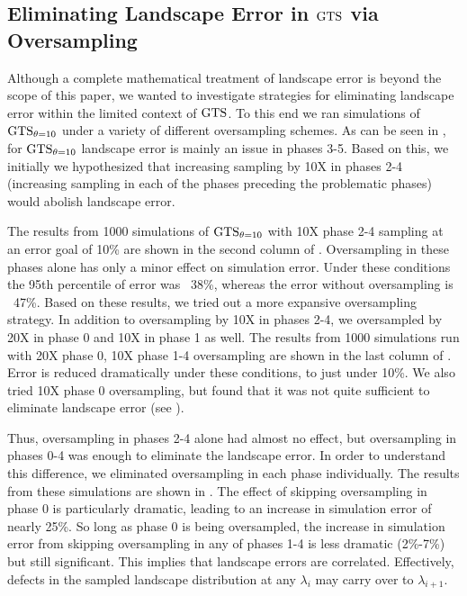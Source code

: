 \subsection{Eliminating Landscape Error in $\text{GTS}$ via Oversampling}
\label{sec:oversampling}

Although a complete mathematical treatment of landscape error is beyond the scope of this paper, we wanted to investigate strategies for eliminating landscape error within the limited context of $\text{GTS}$. To this end we ran  simulations of $\text{GTS}_{\theta=10}$ under a variety of different oversampling schemes. As can be seen in , for $\text{GTS}_{\theta=10}$ landscape error is mainly an issue in phases 3-5. Based on this, we initially we hypothesized that increasing sampling by 10X in phases 2-4 (\ie increasing sampling in each of the phases preceding the problematic phases) would abolish landscape error.

The results from 1000 simulations of $\text{GTS}_{\theta=10}$ with 10X phase 2-4 sampling at an error goal of 10\% are shown in the second column of . Oversampling in these phases alone has only a minor effect on simulation error. Under these conditions the 95th percentile of error was ~38\%, whereas the error without oversampling is ~47\%. Based on these results, we tried out a more expansive oversampling strategy. In addition to oversampling by 10X in phases 2-4, we oversampled by 20X in phase 0 and 10X in phase 1 as well. The results from 1000 simulations run with 20X phase 0, 10X phase 1-4 oversampling are shown in the last column of . Error is reduced dramatically under these conditions, to just under 10\%. We also tried 10X phase 0 oversampling, but found that it was not quite sufficient to eliminate landscape error (see ).

Thus, oversampling in phases 2-4 alone had almost no effect, but oversampling in phases 0-4 was enough to eliminate the landscape error. In order to understand this difference, we eliminated oversampling in each phase individually. The results from these simulations are shown in . The effect of skipping oversampling in phase 0 is particularly dramatic, leading to an increase in simulation error of nearly 25\%. So long as phase 0 is being oversampled, the increase in simulation error from skipping oversampling in any of phases 1-4 is less dramatic (2\%-7\%) but still significant. This implies that landscape errors are correlated. Effectively, defects in the sampled landscape distribution at any $\lambda_i$ may carry over to $\lambda_{i+1}$.

